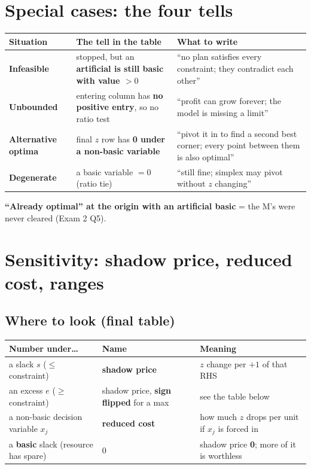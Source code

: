 \documentclass[10pt,a4paper]{article}
\newcommand{\thead}[1]{\textbf{#1}}
\newcommand{\Le}{\ensuremath{\leq}}
\newcommand{\Ge}{\ensuremath{\geq}}
\begin{document}
\section{Special cases: the four tells}

\begin{tabularx}{\linewidth}{@{}l L L@{}}
\toprule
\thead{Situation} & \thead{The tell in the table} & \thead{What to write} \\
\midrule
\textbf{Infeasible} & stopped, but an \textbf{artificial is still basic with value $> 0$} & ``no plan satisfies every constraint; they contradict each other'' \\
\textbf{Unbounded} & entering column has \textbf{no positive entry}, so no ratio test & ``profit can grow forever; the model is missing a limit'' \\
\textbf{Alternative optima} & final $z$ row has \textbf{0 under a non-basic variable} & ``pivot it in to find a second best corner; every point between them is also optimal'' \\
\textbf{Degenerate} & a basic variable $= 0$ (ratio tie) & ``still fine; simplex may pivot without $z$ changing'' \\
\bottomrule
\end{tabularx}

\textbf{``Already optimal'' at the origin with an artificial basic} = the M's were never cleared (Exam 2 Q5).

\section{Sensitivity: shadow price, reduced cost, ranges}

\subsection{Where to look (final table)}

\begin{tabularx}{\linewidth}{@{}l l L@{}}
\toprule
\thead{Number under\ldots} & \thead{Name} & \thead{Meaning} \\
\midrule
a slack $s$ (\Le{} constraint) & \textbf{shadow price} & $z$ change per \textbf{$+1$} of that RHS \\
an excess $e$ (\Ge{} constraint) & shadow price, \textbf{sign flipped} for a max & see the table below \\
a non-basic decision variable $x_j$ & \textbf{reduced cost} & how much $z$ drops per unit if $x_j$ is forced in \\
a \textbf{basic} slack (resource has spare) & 0 & shadow price \textbf{0}; more of it is worthless \\
\bottomrule
\end{tabularx}
\end{document}
